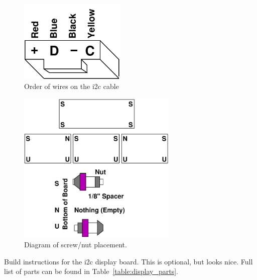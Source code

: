 \documentclass[11pt]{article}
\begin{document}
\begin{figure}[tbp]
\centering
\includegraphics[width=2in]{figs/i2cwire.pdf}
\caption{Order of wires on the i2c cable~\label{figs:i2ccable}}
\end{figure}

\begin{figure}[tbp]
\centering
\includegraphics[width=3in]{figs/nut_diagram.pdf}
\caption{Diagram of screw/nut placement.~\label{figs:nut_diagram}}
\end{figure}


Build instructions for the i2c display board.
This is optional, but looks nice.
Full list of parts can be found in Table~\ref{table:display_parts}.
\end{document}
